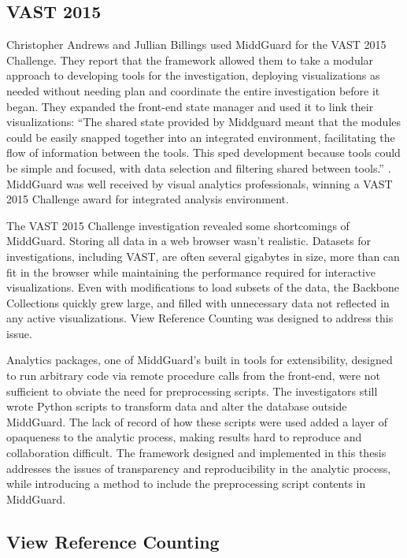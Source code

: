 \documentclass[midd]{thesis}
\begin{document}
\subsection{VAST 2015}

Christopher Andrews and Jullian Billings used MiddGuard for the VAST 2015
Challenge. They report that the framework allowed them to take a modular
approach to developing tools for the investigation, deploying visualizations as
needed without needing plan and coordinate the entire investigation before it
began. They expanded the front-end state manager and used it to link their
visualizations: ``The shared state provided by Middguard meant that the modules
could be easily snapped together into an integrated environment, facilitating
the flow of information between the tools. This sped development because tools
could be simple and focused, with data selection and filtering shared between
tools.'' \cite{middguard-dinofunworld}. MiddGuard was well received by visual
analytics professionals, winning a VAST 2015 Challenge award for integrated
analysis environment.

The VAST 2015 Challenge investigation revealed some shortcomings of MiddGuard.
Storing all data in a web browser wasn't realistic. Datasets for investigations,
including VAST, are often several gigabytes in size, more than can fit in the
browser while maintaining the performance required for interactive
visualizations. Even with modifications to load subsets of the data, the
Backbone Collections quickly grew large, and filled with unnecessary data not
reflected in any active visualizations. View Reference Counting was designed to
address this issue.

Analytics packages, one of MiddGuard's built in tools for extensibility,
designed to run arbitrary code via remote procedure calls from the front-end,
were not sufficient to obviate the need for preprocessing scripts. The
investigators still wrote Python scripts to transform data and alter the
database outside MiddGuard. The lack of record of how these scripts were used
added a layer of opaqueness to the analytic process, making results hard to
reproduce and collaboration difficult. The framework designed and implemented in
this thesis addresses the issues of transparency and reproducibility in the
analytic process, while introducing a method to include the preprocessing script
contents in MiddGuard.

\subsection{View Reference Counting}
\end{document}
